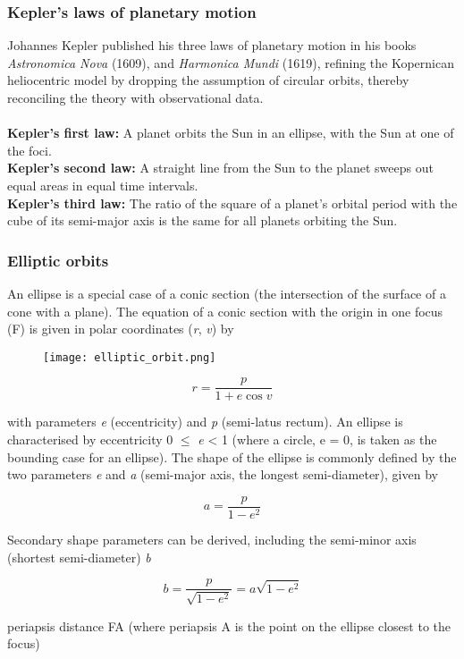 \documentclass[Orbiter User Manual.tex]{subfiles}
\begin{document}
\subsubsection{Kepler’s laws of planetary motion}
Johannes Kepler published his three laws of planetary motion in his books \textit{Astronomica Nova} (1609), and \textit{Harmonica Mundi} (1619), refining the Kopernican heliocentric model by dropping the assumption of circular orbits, thereby reconciling the theory with observational data.\\
\\
\textbf{Kepler’s first law:} A planet orbits the Sun in an ellipse, with the Sun at one of the foci.\\
\textbf{Kepler’s second law:} A straight line from the Sun to the planet sweeps out equal areas in equal time intervals.\\
\textbf{Kepler’s third law:} The ratio of the square of a planet’s orbital period with the cube of its semi-major axis is the same for all planets orbiting the Sun.

\subsubsection{Elliptic orbits}
An ellipse is a special case of a conic section (the intersection of the surface of a cone with a plane). The equation of a conic section with the origin in one focus (F) is given in polar coordinates (\textit{r}, \textit{v}) by

\begin{figure}[H]
	\centering
	\texttt{[image: elliptic\_orbit.png]}
\end{figure}

\[ r = \frac{p}{1 + e \cos v} \]

\noindent
with parameters \textit{e} (eccentricity) and \textit{p} (semi-latus rectum). An ellipse is characterised by eccentricity 0 $\leq$ \textit{e} < 1 (where a circle, e = 0, is taken as the bounding case for an ellipse). The shape of the ellipse is commonly defined by the two parameters \textit{e} and \textit{a} (semi-major axis, the longest semi-diameter), given by

\[ a = \frac{p}{1 - e^{2}} \]

\noindent
Secondary shape parameters can be derived, including the semi-minor axis (shortest semi-diameter) \textit{b}

\[ b = \frac{p}{\sqrt{1 - e^{2}}} = a \sqrt{1 - e^{2}} \]

\noindent
periapsis distance FA (where periapsis A is the point on the ellipse closest to the focus)
\end{document}
